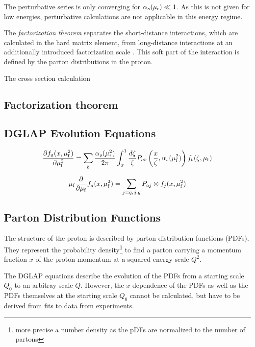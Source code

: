 The perturbative series is only converging for $\alpha_{s}(\mu_{\mathrm{r}}) \ll 1$. As this is not
given for low energies, perturbative calculations are not applicable in this
energy regime. 

The \emph{factorization theorem} separates the short-distance interactions,
which are calculated in the hard matrix element, from long-distance
interactions at an additionally introduced factorization scale \muf. This soft
part of the interaction is defined by the parton distributions in the proton.

The cross section calculation 

\subsection{Factorization theorem}
\label{sec:factorization_theorem}

\subsection{DGLAP Evolution Equations}

\begin{equation*}
    \frac{\partial f_a (x, \mu_{\mathrm{f}}^2)}{\partial \mu_{\mathrm{f}}^2} = \sum_b \frac{\alpha_{s}(\mu_{\mathrm{f}}^2)}{2 \pi} \int_x^1
    \frac{d \zeta}{\zeta} P_{ab} \left(\frac{x}{\zeta},
    \alpha_{s}(\mu_{\mathrm{f}}^2)\right) f_b(\zeta, \mu_{\mathrm{f}})
\end{equation*}

\begin{equation*}
    \mu_{\mathrm{f}} \frac{\partial}{\partial \mu_{\mathrm{f}}} f_a(x, \mu_{\mathrm{f}}^2)  = \sum_{j=q,\bar q, g}
    P_{aj} \otimes f_j(x, \mu_{\mathrm{f}}^2)
\end{equation*}



\subsection{Parton Distribution Functions}

The structure of the proton is described by parton distribution functions
(PDFs).  They represent the probability density\footnote{more precise a number
density as the pDFs are normalized to the number of partons} to find a parton
carrying a momentum fraction $x$ of the proton momentum at a squared energy
scale $Q^2$. 

The DGLAP equations describe the evolution of the PDFs from a starting scale
$Q_0$ to an arbitray scale $Q$. However, the $x$-dependence of the PDFs as well
as the PDFs themselves at the starting scale $Q_0$ cannot be calculated, but
have to be derived from fits to data from experiments.

